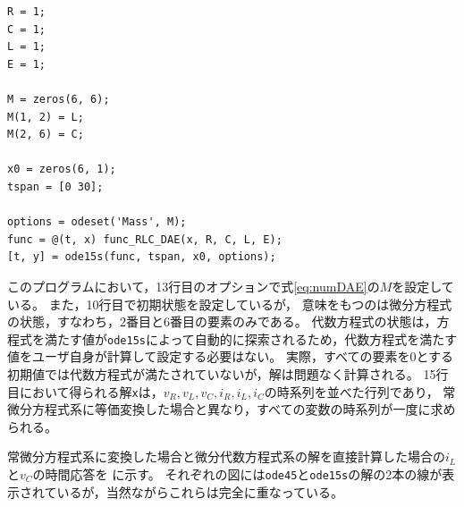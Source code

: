 \documentclass[tombow,dvipdfmx]{corona-a5-1.1}
\begin{document}
{\begin{例}[簡単な微分代数方程式の数値解法]
\begin{PROGRAMA}[count,title={main\_RLC\_DAE.m}]\label{program:DAE1}
  \begin{verbatim}
R = 1;
C = 1;
L = 1;
E = 1;

M = zeros(6, 6);
M(1, 2) = L;
M(2, 6) = C;

x0 = zeros(6, 1);
tspan = [0 30];

options = odeset('Mass', M);
func = @(t, x) func_RLC_DAE(x, R, C, L, E);
[t, y] = ode15s(func, tspan, x0, options); 
\end{verbatim}
\end{PROGRAMA}
このプログラムにおいて，13行目のオプションで式\ref{eq:numDAE}の$M$を設定している。
また，10行目で初期状態を設定しているが，
意味をもつのは微分方程式の状態，すなわち，2番目と6番目の要素のみである。
代数方程式の状態は，方程式を満たす値が\verb|ode15s|によって自動的に探索されるため，代数方程式を満たす値をユーザ自身が計算して設定する必要はない。
実際，すべての要素を$0$とする初期値では代数方程式が満たされていないが，解は問題なく計算される。
15行目において得られる解\verb|x|は，$v_R, v_L, v_C, i_R, i_L, i_C$の時系列を並べた行列であり，
常微分方程式系に等価変換した場合と異なり，すべての変数の時系列が一度に求められる。

常微分方程式系に変換した場合と微分代数方程式系の解を直接計算した場合の$i_L$と$v_C$の時間応答を
に示す。
それぞれの図には\verb|ode45|と\verb|ode15s|の解の2本の線が表示されているが，当然ながらこれらは完全に重なっている。


\end{例}}
\end{document}
